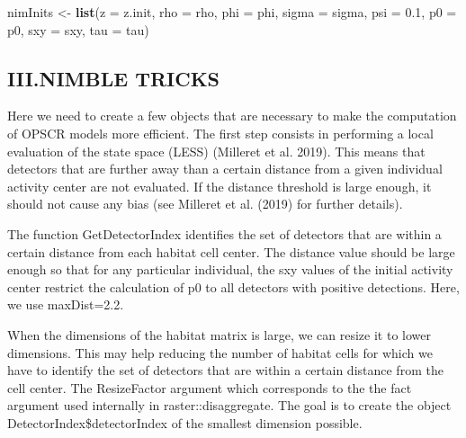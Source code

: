 \documentclass[
]{article}
\newenvironment{Shaded}{\begin{snugshade}}{\end{snugshade}}
\newcommand{\CommentTok}[1]{\textcolor[rgb]{0.56,0.35,0.01}{\textit{#1}}}
\newcommand{\DataTypeTok}[1]{\textcolor[rgb]{0.13,0.29,0.53}{#1}}
\newcommand{\DecValTok}[1]{\textcolor[rgb]{0.00,0.00,0.81}{#1}}
\newcommand{\FloatTok}[1]{\textcolor[rgb]{0.00,0.00,0.81}{#1}}
\newcommand{\KeywordTok}[1]{\textcolor[rgb]{0.13,0.29,0.53}{\textbf{#1}}}
\newcommand{\NormalTok}[1]{#1}
\newcommand{\OperatorTok}[1]{\textcolor[rgb]{0.81,0.36,0.00}{\textbf{#1}}}
\newcommand{\OtherTok}[1]{\textcolor[rgb]{0.56,0.35,0.01}{#1}}
\newcommand{\StringTok}[1]{\textcolor[rgb]{0.31,0.60,0.02}{#1}}
\begin{document}
\begin{Shaded}
\begin{Highlighting}[]
\NormalTok{nimInits <-}\StringTok{ }\KeywordTok{list}\NormalTok{(}\DataTypeTok{z =}\NormalTok{ z.init, }\DataTypeTok{rho =}\NormalTok{ rho, }\DataTypeTok{phi =}\NormalTok{ phi, }\DataTypeTok{sigma =}\NormalTok{ sigma,}
                 \DataTypeTok{psi =} \FloatTok{0.1}\NormalTok{, }\DataTypeTok{p0 =}\NormalTok{ p0, }\DataTypeTok{sxy =}\NormalTok{ sxy, }\DataTypeTok{tau =}\NormalTok{ tau)}
\end{Highlighting}
\end{Shaded}

\hypertarget{iii.nimble-tricks}{%
\subsection{III.NIMBLE TRICKS}\label{iii.nimble-tricks}}

Here we need to create a few objects that are necessary to make the
computation of OPSCR models more efficient. The first step consists in
performing a local evaluation of the state space (LESS) (Milleret et al.
2019). This means that detectors that are further away than a certain
distance from a given individual activity center are not evaluated. If
the distance threshold is large enough, it should not cause any bias
(see Milleret et al. (2019) for further details).

The function GetDetectorIndex identifies the set of detectors that are
within a certain distance from each habitat cell center. The distance
value should be large enough so that for any particular individual, the
sxy values of the initial activity center restrict the calculation of p0
to all detectors with positive detections. Here, we use maxDist=2.2.

When the dimensions of the habitat matrix is large, we can resize it to
lower dimensions. This may help reducing the number of habitat cells for
which we have to identify the set of detectors that are within a certain
distance from the cell center. The ResizeFactor argument which
corresponds to the the fact argument used internally in
raster::disaggregate. The goal is to create the object
DetectorIndex\$detectorIndex of the smallest dimension possible.

\begin{Shaded}
\end{Shaded}
\end{document}
